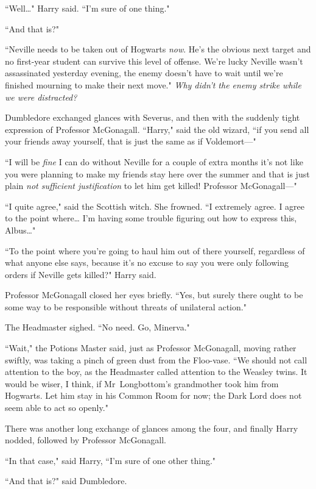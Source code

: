 ``Well{\ldots}" Harry said. ``I'm sure of one thing."

``And that is?"

``Neville needs to be taken out of Hogwarts \emph{now}. He's the obvious next target and no first-year student can survive this level of offense. We're lucky Neville wasn't assassinated yesterday evening, the enemy doesn't have to wait until we're finished mourning to make their next move." \emph{Why didn't the enemy strike while we were distracted?}

Dumbledore exchanged glances with Severus, and then with the suddenly tight expression of Professor McGonagall. ``Harry," said the old wizard, ``if you send all your friends away yourself, that is just the same as if Voldemort—"

``I will be \emph{fine} I can do without Neville for a couple of extra months it's not like you were planning to make my friends stay here over the summer and that is just plain \emph{not sufficient justification} to let him get killed! Professor McGonagall—"

``I quite agree," said the Scottish witch. She frowned. ``I extremely agree. I agree to the point where{\ldots} I'm having some trouble figuring out how to express this, Albus{\ldots}"

``To the point where you're going to haul him out of there yourself, regardless of what anyone else says, because it's no excuse to say you were only following orders if Neville gets killed?" Harry said.

Professor McGonagall closed her eyes briefly. ``Yes, but surely there ought to be some way to be responsible without threats of unilateral action."

The Headmaster sighed. ``No need. Go, Minerva."

``Wait," the Potions Master said, just as Professor McGonagall, moving rather swiftly, was taking a pinch of green dust from the Floo-vase. ``We should not call attention to the boy, as the Headmaster called attention to the Weasley twins. It would be wiser, I think, if Mr~Longbottom's grandmother took him from Hogwarts. Let him stay in his Common Room for now; the Dark Lord does not seem able to act so openly."

There was another long exchange of glances among the four, and finally Harry nodded, followed by Professor McGonagall.

``In that case," said Harry, ``I'm sure of one other thing."

``And that is?" said Dumbledore.

